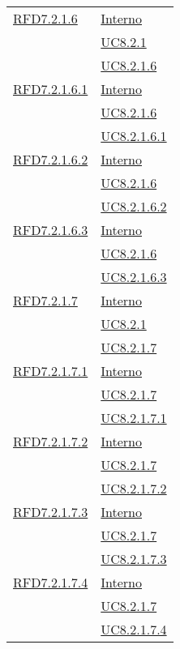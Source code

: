 \begin{longtable}{|>{\centering}m{5cm}|m{5cm}<{\centering}|}
\hyperlink{RFD7.2.1.6}{RFD7.2.1.6} & \hyperlink{Interno}{Interno}\\
& \hyperref[UC8.2.1]{UC8.2.1}\\
& \hyperref[UC8.2.1.6]{UC8.2.1.6}\\ \hline

\hyperlink{RFD7.2.1.6.1}{RFD7.2.1.6.1} & \hyperlink{Interno}{Interno}\\
& \hyperref[UC8.2.1.6]{UC8.2.1.6}\\
& \hyperref[UC8.2.1.6.1]{UC8.2.1.6.1}\\ \hline

\hyperlink{RFD7.2.1.6.2}{RFD7.2.1.6.2} & \hyperlink{Interno}{Interno}\\
& \hyperref[UC8.2.1.6]{UC8.2.1.6}\\
& \hyperref[UC8.2.1.6.2]{UC8.2.1.6.2}\\ \hline

\hyperlink{RFD7.2.1.6.3}{RFD7.2.1.6.3} & \hyperlink{Interno}{Interno}\\
& \hyperref[UC8.2.1.6]{UC8.2.1.6}\\
& \hyperref[UC8.2.1.6.3]{UC8.2.1.6.3}\\ \hline

\hyperlink{RFD7.2.1.7}{RFD7.2.1.7} & \hyperlink{Interno}{Interno}\\
& \hyperref[UC8.2.1]{UC8.2.1}\\
& \hyperref[UC8.2.1.7]{UC8.2.1.7}\\ \hline

\hyperlink{RFD7.2.1.7.1}{RFD7.2.1.7.1} & \hyperlink{Interno}{Interno}\\
& \hyperref[UC8.2.1.7]{UC8.2.1.7}\\
& \hyperref[UC8.2.1.7.1]{UC8.2.1.7.1}\\ \hline

\hyperlink{RFD7.2.1.7.2}{RFD7.2.1.7.2} & \hyperlink{Interno}{Interno}\\
& \hyperref[UC8.2.1.7]{UC8.2.1.7}\\
& \hyperref[UC8.2.1.7.2]{UC8.2.1.7.2}\\ \hline

\hyperlink{RFD7.2.1.7.3}{RFD7.2.1.7.3} & \hyperlink{Interno}{Interno}\\
& \hyperref[UC8.2.1.7]{UC8.2.1.7}\\
& \hyperref[UC8.2.1.7.3]{UC8.2.1.7.3}\\ \hline

\hyperlink{RFD7.2.1.7.4}{RFD7.2.1.7.4} & \hyperlink{Interno}{Interno}\\
& \hyperref[UC8.2.1.7]{UC8.2.1.7}\\
& \hyperref[UC8.2.1.7.4]{UC8.2.1.7.4}\\ \hline


\end{longtable}
